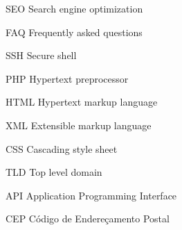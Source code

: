 \documentclass[
	12pt,				%
	oneside,			%
	a4paper,			%
	french,				%
	spanish,			%
	english,			%
	brazil				%
	]{abntex2}
\newcommand{\basePath}{/var/www/html/meninadasbalas/project/monografia/latex}
\begin{document}
\begin{siglas}
  \item[SEO] Search engine optimization
  \item[FAQ] Frequently asked questions
  \item[SSH] Secure shell
  \item[PHP] Hypertext preprocessor
  \item[HTML] Hypertext markup language
  \item[XML] Extensible markup language
  \item[CSS] Cascading style sheet
  \item[TLD] Top level domain
  \item[API] Application Programming Interface
  \item[CEP] Código de Endereçamento Postal
\end{siglas}

\tableofcontents*
\clearpage

\textual








\postextual




%
%


\begin{apendicesenv}

\partapendices



\end{apendicesenv}
\end{document}
